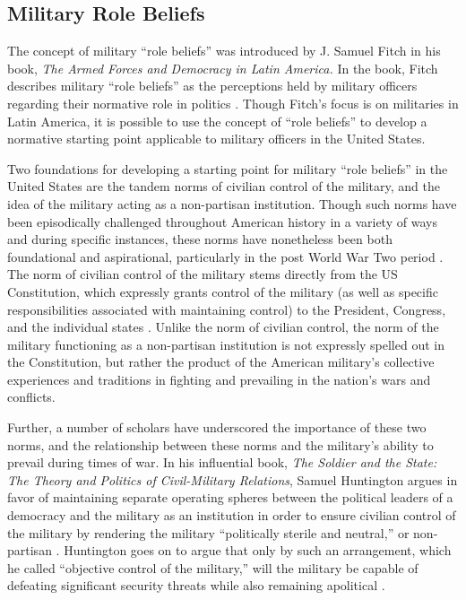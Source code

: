 \documentclass[12pt,]{article}
\begin{document}
\doublespace

\hypertarget{military-role-beliefs}{%
\subsection{Military Role Beliefs}\label{military-role-beliefs}}

The concept of military ``role beliefs'' was introduced by J. Samuel Fitch in his book, \emph{The Armed Forces and Democracy in Latin America.} In the book, Fitch describes military ``role beliefs'' as the perceptions held by military officers regarding their normative role in politics \autocite[61]{fitch_armed_1998}. Though Fitch's focus is on militaries in Latin America, it is possible to use the concept of ``role beliefs'' to develop a normative starting point applicable to military officers in the United States.

Two foundations for developing a starting point for military ``role beliefs'' in the United States are the tandem norms of civilian control of the military, and the idea of the military acting as a non-partisan institution. Though such norms have been episodically challenged throughout American history in a variety of ways and during specific instances, these norms have nonetheless been both foundational and aspirational, particularly in the post World War Two period \autocite{weigley_american_2001}. The norm of civilian control of the military stems directly from the US Constitution, which expressly grants control of the military (as well as specific responsibilities associated with maintaining control) to the President, Congress, and the individual states \autocite{noauthor_us_1787-2}. Unlike the norm of civilian control, the norm of the military functioning as a non-partisan institution is not expressly spelled out in the Constitution, but rather the product of the American military's collective experiences and traditions in fighting and prevailing in the nation's wars and conflicts.

Further, a number of scholars have underscored the importance of these two norms, and the relationship between these norms and the military's ability to prevail during times of war. In his influential book, \emph{The Soldier and the State: The Theory and Politics of Civil-Military Relations}, Samuel Huntington argues in favor of maintaining separate operating spheres between the political leaders of a democracy and the military as an institution in order to ensure civilian control of the military by rendering the military ``politically sterile and neutral,'' or non-partisan \autocite[84]{huntington_soldier_1957}. Huntington goes on to argue that only by such an arrangement, which he called ``objective control of the military,'' will the military be capable of defeating significant security threats while also remaining apolitical \autocite[83-84]{huntington_soldier_1957}.
\end{document}
